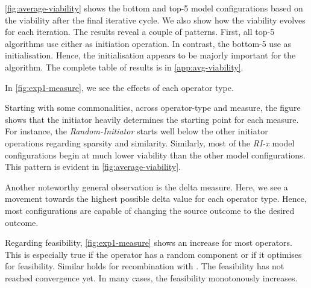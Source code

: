 \documentclass[./../../paper.tex]{subfiles}
\begin{document}
\autoref{fig:average-viability} shows the bottom and top-5 model configurations based on the viability after the final iterative cycle. We also show how the viability evolves for each iteration. The results reveal a couple of patterns. 
First, all top-5 algorithms use either  as initiation operation. In contrast, the bottom-5 use  as initialisation. Hence, the initialisation appears to be majorly important for the algorithm.
The complete table of results is in \autoref{app:avg-viability}.




In \autoref{fig:exp1-measure}, we see the effects of each operator type. 

Starting with some commonalities, across operator-type and measure, the figure shows that the initiator heavily determines the starting point for each measure. For instance, the \emph{Random-Initiator} starts well below the other initiator operations regarding sparsity and similarity. Similarly, most of the \emph{RI-x} model configurations begin at much lower viability than the other model configurations. This pattern is evident in \autoref{fig:average-viability}. 

Another noteworthy general observation is the delta measure. Here, we see a movement towards the highest possible delta value for each operator type. Hence, most configurations are capable of changing the source outcome to the desired outcome. 

Regarding feasibility, \autoref{fig:exp1-measure} shows an increase for most operators. This is especially true if the operator has a random component or if it optimises for feasibility. Similar holds for recombination with . The feasibility has not reached convergence yet. In many cases, the feasibility monotonously increases.  
\end{document}
